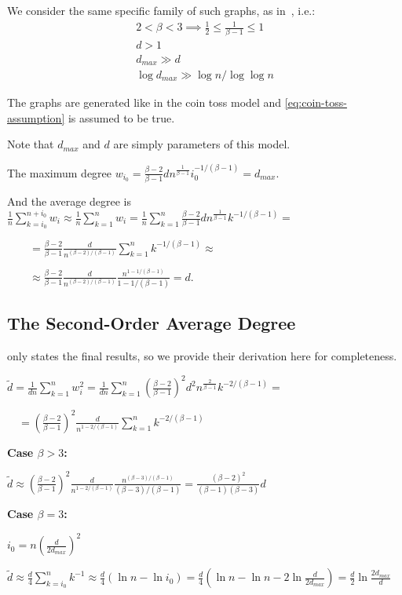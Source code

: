 We consider the same specific family of such graphs, as in~\cite{cl04}, i.e.:
\begin{gather}
    2<\beta<3\implies\frac{1}{2}\leq\frac{1}{\beta-1}\leq 1\\
    d>1\\
    d_{max}\gg d\\
    \log d_{max}\gg \log n/\log\log n
\end{gather}

The graphs are generated like in the coin toss model
and \eqref{eq:coin-toss-assumption} is assumed to be true.

Note that $d_{max}$ and $d$ are simply parameters of this model.

The maximum degree $w_{i_0}=\frac{\beta-2}{\beta-1}dn^{\frac{1}{\beta-1}}i_0^{-1/(\beta-1)}=d_{max}$.

And the average degree is $\frac{1}{n}\sum_{k=i_0}^{n+i_0}{w_i}
\approx\frac{1}{n}\sum_{k=1}^{n}{w_i}
=\frac{1}{n}\sum_{k=1}^{n}{
    \frac{\beta-2}{\beta-1}dn^{\frac{1}{\beta-1}}k^{-1/(\beta-1)}
}=$

$\qquad=\frac{\beta-2}{\beta-1}\frac{d}{n^{(\beta-2)/(\beta-1)}}
\sum_{k=1}^{n}{k^{-1/(\beta-1)}}\approx$
    
$\qquad\approx\frac{\beta-2}{\beta-1}\frac{d}{n^{(\beta-2)/(\beta-1)}}
\frac{n^{1-1/(\beta-1)}}{1-1/(\beta-1)}=d$.

\subsection{The Second-Order Average Degree}

\cite{cl04} only states the final results, so we provide
their derivation here for completeness.

$\tilde{d}=\frac{1}{dn}\sum_{k=1}^{n}{w_i^2}
=\frac{1}{dn}\sum_{k=1}^{n}{
    \left(\frac{\beta-2}{\beta-1}\right)^2d^2n^{\frac{2}{\beta-1}}k^{-2/(\beta-1)}
}=$

$\quad=\left(\frac{\beta-2}{\beta-1}\right)^2\frac{d}{n^{1-2/(\beta-1)}}
\sum_{k=1}^{n}{k^{-2/(\beta-1)}}$

\textbf{Case $\beta>3$:}

$\tilde{d}\approx\left(\frac{\beta-2}{\beta-1}\right)^2\frac{d}{n^{1-2/(\beta-1)}}
\frac{n^{(\beta-3)/(\beta-1)}}{(\beta-3)/(\beta-1)}
=\frac{(\beta-2)^2}{(\beta-1)(\beta-3)}d$

\textbf{Case $\beta=3$:}

$i_0=n\left(\frac{d}{2d_{max}}\right)^2$

$\tilde{d}\approx\frac{d}{4}\sum_{k=i_0}^{n}{k^{-1}}\approx\frac{d}{4}(\ln n-\ln i_0)
=\frac{d}{4}(\ln n-\ln n-2\ln\frac{d}{2d_{max}})=\frac{d}{2}\ln\frac{2d_{max}}{d}$

